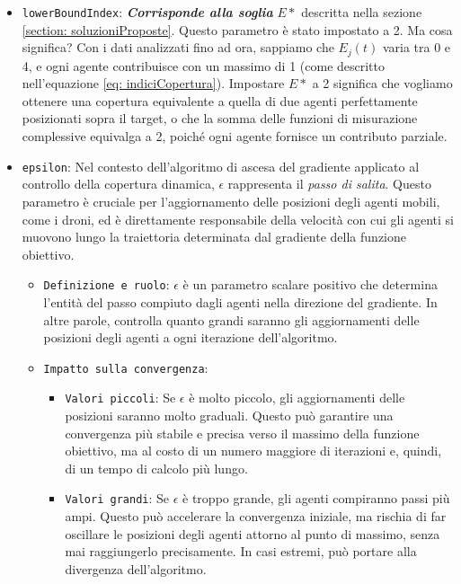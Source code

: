 \documentclass[twoside]{article}
\begin{document}
\begin{itemize}
    \item \verb|lowerBoundIndex|: \textit{\textbf{Corrisponde alla soglia}} \ensuremath{E*} descritta nella sezione \ref{section: soluzioniProposte}. Questo parametro è stato impostato a 2. Ma cosa significa? Con i dati analizzati fino ad ora, sappiamo che \ensuremath{E_j(t)} varia tra 0 e 4, e ogni agente contribuisce con un massimo di 1 (come descritto nell'equazione \ref{eq: indiciCopertura}). Impostare \ensuremath{E*} a 2 significa che vogliamo ottenere una copertura equivalente a quella di due agenti perfettamente posizionati sopra il target, o che la somma delle funzioni di misurazione complessive equivalga a 2, poiché ogni agente fornisce un contributo parziale.
    
    \item \verb|epsilon|: Nel contesto dell'algoritmo di ascesa del gradiente applicato al controllo della copertura dinamica, \(\epsilon\) rappresenta il \textit{passo di salita}. Questo parametro è cruciale per l'aggiornamento delle posizioni degli agenti mobili, come i droni, ed è direttamente responsabile della velocità con cui gli agenti si muovono lungo la traiettoria determinata dal gradiente della funzione obiettivo.

    \begin{itemize}
        \item \verb|Definizione e ruolo|: \(\epsilon\) è un parametro scalare positivo che determina l'entità del passo compiuto dagli agenti nella direzione del gradiente. In altre parole, controlla quanto grandi saranno gli aggiornamenti delle posizioni degli agenti a ogni iterazione dell'algoritmo.
        
        \item \verb|Impatto sulla convergenza|:
        \begin{itemize}
            \item \verb|Valori piccoli|: Se \(\epsilon\) è molto piccolo, gli aggiornamenti delle posizioni saranno molto graduali. Questo può garantire una convergenza più stabile e precisa verso il massimo della funzione obiettivo, ma al costo di un numero maggiore di iterazioni e, quindi, di un tempo di calcolo più lungo.
            \item \verb|Valori grandi|: Se \(\epsilon\) è troppo grande, gli agenti compiranno passi più ampi. Questo può accelerare la convergenza iniziale, ma rischia di far oscillare le posizioni degli agenti attorno al punto di massimo, senza mai raggiungerlo precisamente. In casi estremi, può portare alla divergenza dell'algoritmo.
        \end{itemize}
        

\end{itemize}
\end{itemize}
\end{document}
